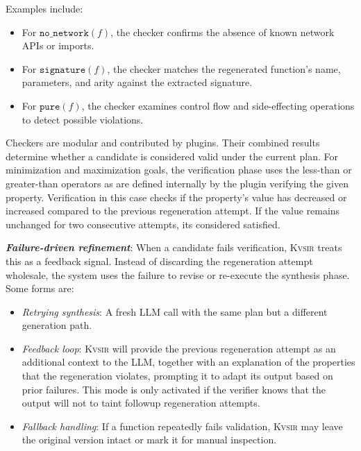 \documentclass[nonacm,sigplan,review]{acmart}
\newcommand{\sys}{{\scshape Kv{\textalpha}sir}\xspace}
\newcommand{\heading}[1]{\vspace{2pt}\noindent\textbf{\emph{#1}}:\enspace}
\begin{document}
Examples include:
\begin{itemize}
  \item For $\texttt{no\_network}(f)$, the checker confirms the absence of known network APIs or imports.
  \item For $\texttt{signature}(f)$, the checker matches the regenerated function's name, parameters, and arity against the extracted signature.
  \item For $\texttt{pure}(f)$, the checker examines control flow and side-effecting operations to detect possible violations.
\end{itemize}

Checkers are modular and contributed by plugins. Their combined results determine whether a candidate is considered valid under the current plan.
For minimization and maximization goals, the verification phase uses the less-than or greater-than operators as are defined internally by the plugin verifying the given property.
Verification in this case checks if the property's value has decreased or increased compared 
to the previous regeneration attempt.
If the value remains unchanged for two consecutive attempts, its considered satisfied.

\heading{Failure-driven refinement}
When a candidate fails verification, \sys treats this as a feedback signal. Instead of discarding the regeneration attempt wholesale, the system uses the failure to revise or re-execute the synthesis phase.
Some forms are:
\begin{itemize}
  \item \emph{Retrying synthesis}: A fresh LLM call with the same plan but a different generation path.
  \item \emph{Feedback loop}: \sys will provide the previous regeneration attempt 
    as an additional context to the LLM, together with an explanation of the properties that the regeneration violates, prompting it to adapt its output based on prior failures.
    This mode is only activated if the verifier knows that the output will not to taint
    followup regeneration attempts.
  \item \emph{Fallback handling}: If a function repeatedly fails validation, \sys may leave the original version intact or mark it for manual inspection.
\end{itemize}

\end{document}
